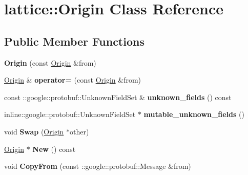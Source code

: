\hypertarget{classlattice_1_1Origin}{
\section{lattice::Origin Class Reference}
\label{classlattice_1_1Origin}
}
\subsection*{Public Member Functions}
\begin{DoxyCompactItemize}
\item 
\hypertarget{classlattice_1_1Origin_ab55cc18582c3bbc262a924e48697f4cc}{
{\bfseries Origin} (const \hyperlink{classlattice_1_1Origin}{Origin} \&from)}
\label{classlattice_1_1Origin_ab55cc18582c3bbc262a924e48697f4cc}

\item 
\hypertarget{classlattice_1_1Origin_aedeaa82dc76b7d0373cd48f33e028b9e}{
\hyperlink{classlattice_1_1Origin}{Origin} \& {\bfseries operator=} (const \hyperlink{classlattice_1_1Origin}{Origin} \&from)}
\label{classlattice_1_1Origin_aedeaa82dc76b7d0373cd48f33e028b9e}

\item 
\hypertarget{classlattice_1_1Origin_ad520c41793348738a3ac1ebb8f5f1189}{
const ::google::protobuf::UnknownFieldSet \& {\bfseries unknown\_\-fields} () const }
\label{classlattice_1_1Origin_ad520c41793348738a3ac1ebb8f5f1189}

\item 
\hypertarget{classlattice_1_1Origin_a07bec9e32b1ab5ffec8a0fb89f3b593a}{
inline::google::protobuf::UnknownFieldSet $\ast$ {\bfseries mutable\_\-unknown\_\-fields} ()}
\label{classlattice_1_1Origin_a07bec9e32b1ab5ffec8a0fb89f3b593a}

\item 
\hypertarget{classlattice_1_1Origin_a0e3a9e1bbd49641331b067a6dd9e2a8e}{
void {\bfseries Swap} (\hyperlink{classlattice_1_1Origin}{Origin} $\ast$other)}
\label{classlattice_1_1Origin_a0e3a9e1bbd49641331b067a6dd9e2a8e}

\item 
\hypertarget{classlattice_1_1Origin_a3963c46290d6dad7032fd9a6a38c9829}{
\hyperlink{classlattice_1_1Origin}{Origin} $\ast$ {\bfseries New} () const }
\label{classlattice_1_1Origin_a3963c46290d6dad7032fd9a6a38c9829}

\item 
\hypertarget{classlattice_1_1Origin_aee8b1f2dd984576e6c73a93d608eb213}{
void {\bfseries CopyFrom} (const ::google::protobuf::Message \&from)}
\label{classlattice_1_1Origin_aee8b1f2dd984576e6c73a93d608eb213}


\end{DoxyCompactItemize}
